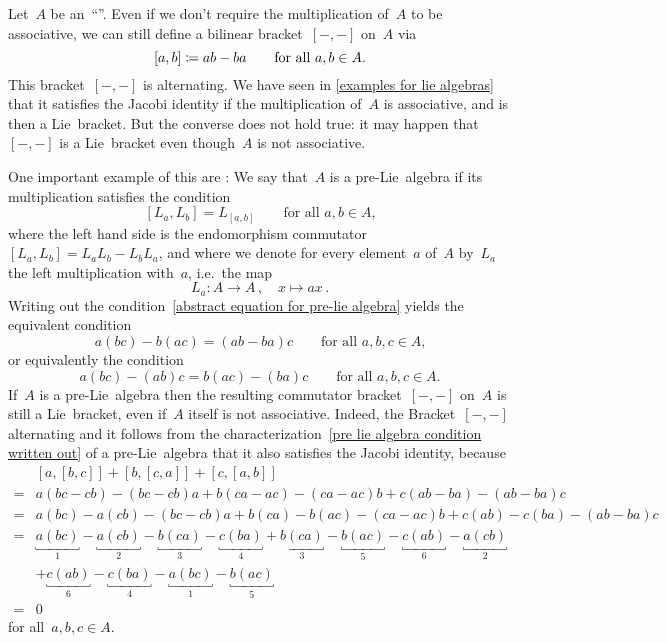 \begin{remark}
  Let~$A$ be an~\enquote{\algebra{$\kf$}}.
  Even if we don’t require the multiplication of~$A$ to be associative, we can still define a bilinear bracket~$[-,-]$ on~$A$ via
  \[
    [a,b]
    \coloneqq
    ab-ba
    \qquad
    \text{for all~$a, b \in A$.}
  \]
  This bracket~$[-,-]$ is alternating.
  We have seen in \cref{examples for lie algebras} that it satisfies the Jacobi identity if the multiplication of~$A$ is associative, and is then a Lie~bracket.
  But the converse does not hold true:
  it may happen that~$[-,-]$ is a Lie~bracket even though~$A$ is not associative.
  
  One important example of this are :
  We say that~$A$ is a pre-Lie~algebra if its multiplication satisfies the condition
  \begin{equation}
    \label{abstract equation for pre-lie algebra}
    [L_a, L_b]
    =
    L_{[a,b]}
    \qquad
    \text{for all~$a, b \in A$,}
  \end{equation}
  where the left hand side is the endomorphism commutator~$[L_a, L_b] = L_a L_b - L_b L_a$, and where we denote for every element~$a$ of~$A$ by~$L_a$ the left multiplication with~$a$, i.e.\ the map
  \[
    L_a
    \colon
    A
    \to
    A \,,
    \quad
    x
    \mapsto
    ax \,.
  \]
  Writing out the condition~\eqref{abstract equation for pre-lie algebra} yields the equivalent condition
  \begin{equation}
    \label{pre lie algebra condition written out}
    a(bc) - b(ac)
    =
    (ab-ba)c
    \qquad
    \text{for all~$a, b, c \in A$,}
  \end{equation}
  or equivalently the condition
  \[
    a(bc) - (ab)c
    =
    b(ac) - (ba)c
    \qquad
    \text{for all~$a, b, c \in A$.}
  \]
  If~$A$ is a pre-Lie~algebra then the resulting commutator bracket~$[-,-]$ on~$A$ is still a Lie~bracket, even if~$A$ itself is not associative.
  Indeed, the Bracket~$[-,-]$ alternating and it follows from the characterization~\eqref{pre lie algebra condition written out} of a pre-Lie~algebra that it also satisfies the Jacobi identity, because
  \begin{align*}
    {}&
    [a, [b,c] ] + [b, [c, a]] + [c, [a, b]]
    \\
    ={}&
    a (bc - cb) - (bc - cb) a
    + b (ca - ac) - (ca - ac) b
    + c (ab - ba) - (ab - ba) c
    \\
    ={}&
    a (bc) - a (cb) - (bc - cb) a
    + b (ca) - b (ac) - (ca - ac) b
    + c (ab) - c (ba) - (ab - ba) c
    \\
    ={}&
    \underbracket{a (bc)}_{1}
    - \underbracket{a (cb)}_{2}
    - \underbracket{b (ca)}_{3}
    - \underbracket{c (ba)}_{4}
    + \underbracket{b (ca)}_{3}
    - \underbracket{b (ac)}_{5}
    - \underbracket{c (ab)}_{6}
    - \underbracket{a (cb)}_{2}
    \\
    {}&
    + \underbracket{c (ab)}_{6}
    - \underbracket{c (ba)}_{4}
    - \underbracket{a (bc)}_{1}
    - \underbracket{b (ac)}_{5}
    \\
    ={}&
    0
  \end{align*}
  for all~$a, b, c \in A$.


\end{remark}
